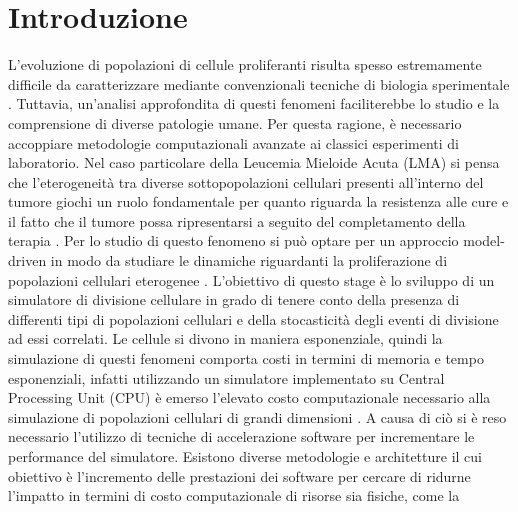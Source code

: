 
\chapter{Introduzione} %

\label{Introduzione} %



L’evoluzione di popolazioni di cellule proliferanti risulta spesso estremamente
difficile da caratterizzare mediante convenzionali tecniche di biologia
sperimentale \cite{bernitz2016stem}. Tuttavia, un’analisi approfondita di questi fenomeni
faciliterebbe lo studio e la comprensione di diverse patologie umane.
Per questa ragione, è necessario accoppiare metodologie computazionali 
avanzate ai classici esperimenti di laboratorio. Nel caso particolare della 
Leucemia Mieloide Acuta (LMA) si pensa che l'eterogeneità tra diverse 
sottopopolazioni cellulari presenti all'interno del tumore giochi un ruolo 
fondamentale per quanto riguarda la resistenza alle cure e il fatto che il 
tumore possa ripresentarsi a seguito del completamento della terapia 
\cite{dohner2015aml}.
Per lo studio di questo fenomeno si può optare per un approccio model-driven 
in modo da studiare le dinamiche riguardanti la proliferazione di 
popolazioni cellulari eterogenee \cite{aml2018unimib}. 
L'obiettivo di questo stage è lo sviluppo di un 
simulatore di divisione cellulare in grado di tenere conto della presenza 
di differenti tipi di popolazioni cellulari e della stocasticità degli eventi
di divisione ad essi correlati. Le cellule si divono in maniera esponenziale, 
quindi la simulazione di questi fenomeni comporta costi in termini di memoria 
e tempo esponenziali, infatti utilizzando un simulatore implementato 
su Central Processing Unit (CPU) è emerso l'elevato costo 
computazionale necessario alla simulazione di popolazioni cellulari di grandi 
dimensioni \cite{aml2018unimib}. A causa di ciò si è reso necessario 
l'utilizzo di tecniche di accelerazione software per incrementare le 
performance del simulatore. Esistono diverse metodologie e architetture il cui 
obiettivo è l'incremento delle prestazioni dei software per cercare di ridurne
l'impatto in termini di costo computazionale di risorse sia fisiche, come la 
